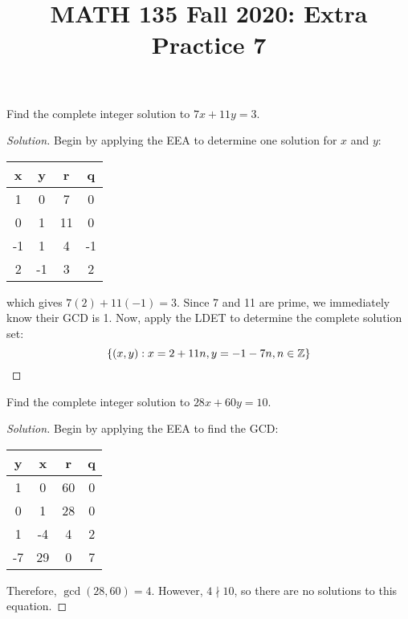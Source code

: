 
\title{MATH 135 Fall 2020: Extra Practice 7}


\thispagestyle{firstpage}

\textbf{\@title}


\question Find the complete integer solution to $7x+11y=3$.
\begin{proof}[Solution]
  Begin by applying the EEA to determine one solution for $x$ and $y$:
  \begin{center}
    \begin{tabular}{C|C|C|C}
      x  & y  & r  & q  \\   & 0  & 7  & 0  \\
      0  & 1  & 11 & 0  \\
      -1 & 1  & 4  & -1 \\
      2  & -1 & 3  & 2
    \end{tabular}
  \end{center}
  which gives $7(2)+11(-1)=3$.
  Since 7 and 11 are prime, we immediately know their GCD is 1.
  Now, apply the LDET to determine the complete solution set:
  \begin{equation*}
    \{ (x,y) : x = 2 + 11n, y = -1 - 7n, n\in\mathbb{Z} \} \qedhere
  \end{equation*}
\end{proof}


\question Find the complete integer solution to $28x+60y=10$.
\begin{proof}[Solution]
  Begin by applying the EEA to find the GCD\@:
  \begin{center}
    \begin{tabular}{C|C|C|C}
      y  & x  & r  & q \\   & 0  & 60 & 0 \\
      0  & 1  & 28 & 0 \\
      1  & -4 & 4  & 2 \\
      -7 & 29 & 0  & 7
    \end{tabular}
  \end{center}
  Therefore, $\gcd(28,60)=4$.
  However, $4 \nmid 10$, so there are no solutions to this equation.
\end{proof}



